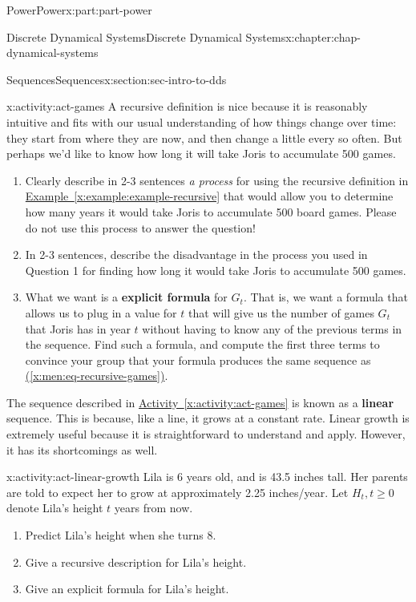 \documentclass[oneside,10pt,]{book}
\newcommand{\xreffont}{\relax}
\newcommand{\terminology}[1]{\textbf{#1}}
\numberwithin{equation}{section}
\renewcommand{\ge}{\geqslant}
\begin{document}
\begin{partptx}{Power}{}{Power}{}{}{x:part:part-power}
\begin{chapterptx}{Discrete Dynamical Systems}{}{Discrete Dynamical Systems}{}{}{x:chapter:chap-dynamical-systems}
\begin{sectionptx}{Sequences}{}{Sequences}{}{}{x:section:sec-intro-to-dds}
\begin{activity}{}{x:activity:act-games}%
A recursive definition is nice because it is reasonably intuitive and fits with our usual understanding of how things change over time: they start from where they are now, and then change a little every so often. But perhaps we'd like to know how long it will take Joris to accumulate 500 games. %
%
\begin{enumerate}
\item{}Clearly describe in 2-3 sentences \emph{a process} for using the recursive definition in \hyperref[x:example:example-recursive]{Example~{\xreffont\ref{x:example:example-recursive}}} that would allow you to determine how many years it would take Joris to accumulate 500 board games. Please do not use this process to answer the question!%
\item{}In 2-3 sentences, describe the disadvantage in the process you used in Question 1 for finding how long it would take Joris to accumulate 500 games.%
\item{}What we want is a \terminology{explicit formula} for \(G_t\). That is, we want a formula that allows us to plug in a value for \(t\) that will give us the number of games \(G_t\) that Joris has in year \(t\) without having to know any of the previous terms in the sequence. Find such a formula, and compute the first three terms to convince your group that your formula produces the same sequence as \hyperref[x:men:eq-recursive-games]{({\xreffont\ref{x:men:eq-recursive-games}})}.%
\end{enumerate}
\end{activity}%
The sequence described in \hyperref[x:activity:act-games]{Activity~{\xreffont\ref{x:activity:act-games}}} is known as a \terminology{linear} sequence. This is because, like a line, it grows at a constant rate. Linear growth is extremely useful because it is straightforward to understand and apply. However, it has its shortcomings as well.%
\begin{activity}{}{x:activity:act-linear-growth}%
Lila is 6 years old, and is 43.5 inches tall. Her parents are told to expect her to grow at approximately 2.25 inches\slash{}year. Let \(H_t, t\ge 0\) denote Lila's height \(t\) years from now.%
%
\begin{enumerate}
\item{}Predict Lila's height when she turns 8.%
\item{}Give a recursive description for Lila's height.%
\item{}Give an explicit formula for Lila's height.%

\end{enumerate}
\end{activity}
\end{sectionptx}
\end{chapterptx}
\end{partptx}
\end{document}
